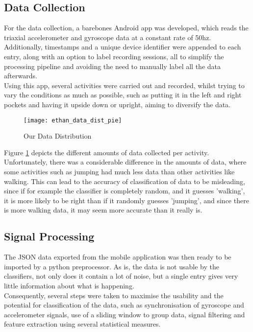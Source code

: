\subsection{Data Collection}
For the data collection, a barebones Android app was developed, which reads the triaxial accelerometer and gyroscope data at a constant rate of 50hz.
Additionally, timestamps and a unique device identifier were appended to each entry, along with an option to label recording sessions, all to simplify the processing pipeline and 
avoiding the need to manually label all the data afterwards.\\
Using this app, several activities were carried out and recorded, whilst trying to vary the conditions as much as possible, such as putting it in the left and right pockets and having it upside down or upright, aiming to diversify the data.  

\begin{figure}[htp]
    \centering
    \texttt{[image: ethan\_data\_dist\_pie]}
    \caption{Our Data Distribution}
    \label{our_data_count_dist}
    \end{figure}

Figure \ref{our_data_count_dist} depicts the different amounts of data 
collected per activity. Unfortunately, there was a considerable difference in the amounts of data, where some activities such as jumping had much less data than other activities like walking. 
This can lead to the accuracy of classification of data to be misleading, since if for example the classifier is completely random, and it guesses 'walking', it is more likely to be right than if it randomly guesses 'jumping', 
and since there is more walking data, it may seem more accurate than it really is.

\subsection{Signal Processing}
The JSON data exported from the mobile application was then ready to be imported by a python preprocessor. As is, the data is not usable by the classifiers, not only does it contain a lot of noise, but a single entry gives very little information about what is happening.\\
Consequently, several steps were taken to maximise the usability and the potential for classification of the data, such as synchronisation of gyroscope and accelerometer signals, use of a sliding window to group data, signal filtering and feature extraction using several statistical measures.   

